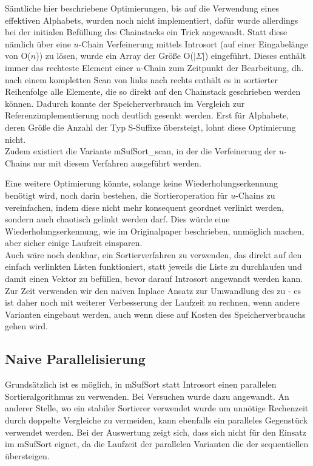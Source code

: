 Sämtliche hier beschriebene Optimierungen, bis auf die Verwendung eines effektiven Alphabets, wurden noch nicht implementiert, dafür wurde allerdings bei der initialen Befüllung des Chainstacks ein Trick angewandt. 
Statt diese nämlich über eine $u$-Chain Verfeinerung mittels Introsort (auf einer Eingabelänge von O($n$)) zu lösen, wurde ein Array der Größe O($|\Sigma|$) eingeführt. Dieses enthält immer das rechteste Element einer $u$-Chain zum Zeitpunkt der Bearbeitung, dh. nach einem kompletten Scan von links nach rechts enthält es in sortierter Reihenfolge alle Elemente, die so direkt auf den Chainstack geschrieben werden können.
Dadurch konnte der Speicherverbrauch im Vergleich zur Referenzimplementierung noch deutlich gesenkt werden. Erst für Alphabete, deren Größe die Anzahl der Typ S-Suffixe übersteigt, lohnt diese Optimierung nicht.\\
Zudem existiert die Variante mSufSort\_scan, in der die Verfeinerung der $u$-Chains nur mit diesem Verfahren ausgeführt werden.

Eine weitere Optimierung könnte, solange keine Wiederholungserkennung benötigt wird, noch darin bestehen, die Sortieroperation für $u$-Chains zu vereinfachen, indem diese nicht mehr konsequent geordnet verlinkt werden, sondern auch chaotisch gelinkt werden darf. Dies würde eine Wiederholungserkennung, wie im Originalpaper beschrieben, unmöglich machen, aber sicher einige Laufzeit einsparen.\\

Auch wäre noch denkbar, ein Sortierverfahren zu verwenden, das direkt auf den einfach verlinkten Listen funktioniert, statt jeweils die Liste zu durchlaufen und damit einen Vektor zu befüllen, bevor darauf Introsort angewandt werden kann.\\

Zur Zeit verwenden wir den naiven Inplace Ansatz zur Umwandlung des \isa zu \sa - es ist daher noch mit weiterer Verbesserung der Laufzeit zu rechnen, wenn andere Varianten eingebaut werden, auch wenn diese auf Kosten des Speicherverbrauchs gehen wird.

\subsection{Naive Parallelisierung}

Grundsätzlich ist es möglich, in mSufSort statt Introsort einen parallelen Sortieralgorithmus zu verwenden. Bei Versuchen wurde dazu \ipsviero \cite{axtmann2017} angewandt. An anderer Stelle, wo ein stabiler Sortierer verwendet wurde um unnötige Rechenzeit durch doppelte Vergleiche zu vermeiden, kann ebenfalls ein paralleles Gegenstück verwendet werden.
Bei der Auswertung zeigt sich, dass \ipsviero sich nicht für den Einsatz im mSufSort eignet, da die Laufzeit der parallelen Varianten die der sequentiellen übersteigen.


